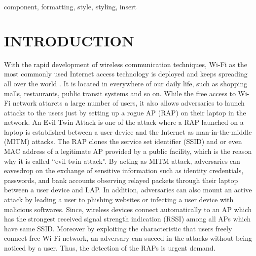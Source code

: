 \documentclass[conference]{IEEEtran}
\begin{document}
\begin{IEEEkeywords}
component, formatting, style, styling, insert
\end{IEEEkeywords}

\section{INTRODUCTION}
With the rapid development of wireless communication techniques, Wi-Fi as the most commonly used Internet access technology is deployed and keeps spreading all over the world\cite{bg-evi} .
It is located in everywhere of our daily life, such as shopping malls, restaurants, public transit systems and so on.
While the free access to Wi-Fi network attarcts a large number of users, it also allows adversaries to launch attacks to the users just by setting up a rogue AP (RAP) on their laptop in the network\cite{laptop-evi}.
An Evil Twin Attack is one of the attack where a RAP launched on a laptop is established between a user device and the Internet as man-in-the-middle (MITM) attacks.
The RAP clones the service set identifier (SSID) and or even MAC address of a legitimate AP provided by a public facility, which is the reason why it is called ``evil twin attack''\cite{spoof-evi}.
By acting as MITM attack, adversaries can eavesdrop on the exchange of sensitive information such as identity credentials, passwords, and bank accounts observing relayed packets through their laptop between a user device and LAP.
In addition, adversaries can also mount an active attack by leading a user to phishing websites or infecting a user device with malicious softwares\cite{research}.
Since, wireless devices connect automatically to an AP which has the strongest received signal strength indication (RSSI) among all APs which have same SSID.
Moreover by exploiting the characteristic that users freely connect free Wi-Fi network,  an adversary can succed in the attacks without being noticed by a user.
Thus, the detection of the RAPs is urgent demand.
\end{document}
